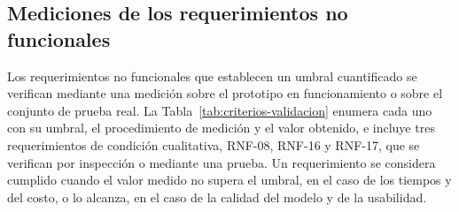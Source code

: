 \subsection{Mediciones de los requerimientos no funcionales}
\label{sec:mediciones-rnf}

Los requerimientos no funcionales que establecen un umbral cuantificado se verifican mediante una medición sobre el prototipo en funcionamiento o sobre el conjunto de prueba real. La Tabla~\ref{tab:criterios-validacion} enumera cada uno con su umbral, el procedimiento de medición y el valor obtenido, e incluye tres requerimientos de condición cualitativa, RNF-08, RNF-16 y RNF-17, que se verifican por inspección o mediante una prueba. Un requerimiento se considera cumplido cuando el valor medido no supera el umbral, en el caso de los tiempos y del costo, o lo alcanza, en el caso de la calidad del modelo y de la usabilidad.

